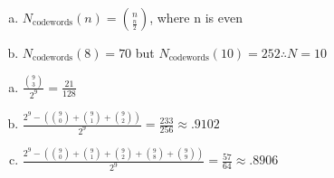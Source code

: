 \documentclass[12pt]{article}
\newenvironment{problem}[2][Problem]{\begin{trivlist}
\item[\hskip \labelsep {\bfseries #1}\hskip \labelsep {\bfseries #2.}]
  \vspace{1 cm}
}{\end{trivlist}}
\begin{document}
\begin{problem}{2.37}
\item
  \begin{enumerate}[a.]
    \item %
      $N_\textrm{codewords}(n) = \binom{n}{\frac{n}{2}}$, where n is even
    \item %
      $N_\textrm{codewords}(8) = 70$ but $N_\textrm{codewords}(10) = 252 \therefore N = 10$
  \end{enumerate}
\end{problem}

\begin{problem}{2.39} 
\item
  \begin{enumerate}[a.]
    \item %
      $\frac{\binom{9}{3}}{2^9} = \frac{21}{128}$
    \item %
      $\frac{2^9 - \left(\binom{9}{0} + \binom{9}{1} + \binom{9}{2}\right)}{2^9} 
      =  \frac{233}{256} \approx .9102$
    \item %
      $\frac{2^9 - \left(\binom{9}{0} + \binom{9}{1} + \binom{9}{2} + \binom{9}{8} + \binom{9}{9}\right)}{2^9} 
      =  \frac{57}{64} \approx .8906$
  \end{enumerate}
\end{problem}
\end{document}

